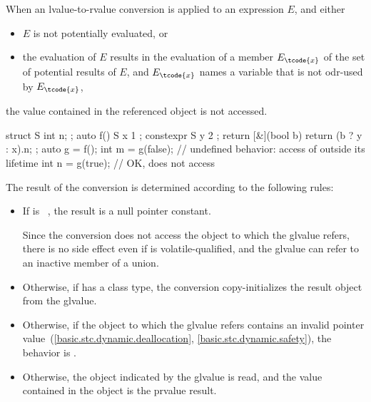 \pnum
When an lvalue-to-rvalue conversion
is applied to an expression $E$, and either
\begin{itemize}
\item $E$ is not potentially evaluated, or
\item the evaluation of $E$ results in the evaluation of a member
      $E_\tcode{x}$ of the set of potential results of $E$, and $E_\tcode{x}$
      names a variable  that is not odr-used by
      $E_\tcode{x}$,
\end{itemize}
the value contained in the referenced object is not accessed.
\begin{example}
\begin{codeblock}
struct S { int n; };
auto f() {
  S x { 1 };
  constexpr S y { 2 };
  return [&](bool b) { return (b ? y : x).n; };
}
auto g = f();
int m = g(false);   // undefined behavior: access of  outside its lifetime
int n = g(true);    // OK, does not access 
\end{codeblock}
\end{example}

\pnum
The result of the conversion is determined according to the
following rules:

\begin{itemize}

\item If  is \cv{}~, the result is a
null pointer constant.
\begin{note}
Since the conversion does not access the object to which the glvalue refers,
there is no side effect even if  is volatile-qualified, and
the glvalue can refer to an inactive member of a union.
\end{note}

\item Otherwise, if  has a class
type, the conversion copy-initializes the result object from
the glvalue.

\item Otherwise, if the object to which the glvalue refers contains an invalid
pointer value~(\ref{basic.stc.dynamic.deallocation},
\ref{basic.stc.dynamic.safety}), the behavior is
.

\item Otherwise, the object indicated by the glvalue is read,
and the value contained in the object is the prvalue result.
\end{itemize}

